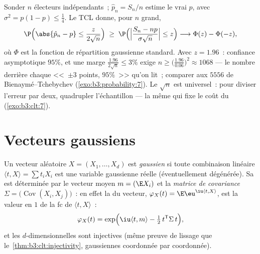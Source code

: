 \begin{example}
\label{ex:b3:clt:confidence}
Sonder $n$ électeurs indépendants~; $\hat p_n = S_n/n$
estime le vrai $p$, avec $\sigma^2 = p(1-p) \leq \frac14$.
Le TCL donne, pour $n$ grand,
\[
\P\Bigl(\abs{\hat p_n - p} \leq
\frac{z}{2\sqrt n}\Bigr)
\;\geq\; \P\Bigl(\Bigl|\frac{S_n - np}{\sigma\sqrt n}\Bigr|
\leq z\Bigr)
\longrightarrow \Phi(z) - \Phi(-z),
\]
où $\Phi$ est la fonction de répartition gaussienne
standard. Avec $z = 1.96$~: confiance asymptotique $95\%$,
et une marge $\frac{1.96}{2\sqrt n} \leq 3\%$ exige $n \geq
\bigl(\frac{1.96}{0.06}\bigr)^2 \approx 1068$ --- le nombre
derrière chaque <<~$\pm3$ points, $95\%$~>> qu'on lit~;
comparer aux $5556$ de Bienaymé--Tchebychev
(\cref{exo:b3:probability:7}). Le $\sqrt n$ est
universel~: pour diviser l'erreur par deux, quadrupler
l'échantillon --- la même  qui fixe le coût du
 (\cref{exo:b3:clt:7}).
\end{example}

\section{Vecteurs gaussiens}

\begin{definition}\label{def:b3:clt:gaussianvector}
Un vecteur aléatoire $X = (X_1, \dots, X_d)$ est
\emph{gaussien} si toute combinaison
linéaire $\langle t, X\rangle = \sum t_iX_i$ est une
variable gaussienne réelle (éventuellement dégénérée). Sa
 est déterminée par le vecteur moyen $m = (\E X_i)$ et la
\emph{matrice de covariance} $\Sigma =
\bigl(\operatorname{Cov}(X_i, X_j)\bigr)$~: en effet la
 du vecteur, $\varphi_X(t) =
\E\eu^{\iu\langle t, X\rangle}$, est la valeur en $1$ de la
fc de $\langle t, X\rangle$~:
\[
\varphi_X(t) = \exp\Bigl(\iu\langle t, m\rangle -
\tfrac12\,t^{\mathsf T}\Sigma\,t\Bigr),
\]
et les  $d$-dimensionnelles sont
injectives (même preuve de lissage que
le~\cref{thm:b3:clt:injectivity}, gaussiennes
coordonnée par coordonnée).
\end{definition}

